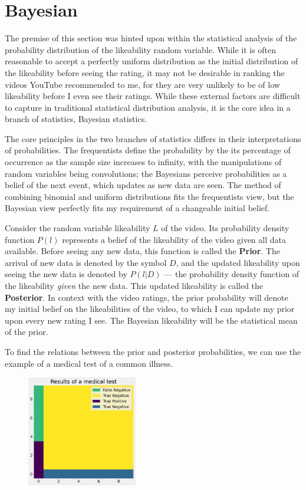 \documentclass[a4paper,11pt]{article}
\begin{document}
\section{Bayesian}

The premise of this section was hinted upon within the statistical analysis of the probability distribution of the likeability random variable. While it is often reasonable to accept a perfectly uniform distribution as the initial distribution of the likeability before seeing the rating, it may not be desirable in ranking the videos YouTube recommended to me, for they are very unlikely to be of low likeability before I even see their ratings. While these external factors are difficult to capture in traditional statistical distribution analysis, it is the core idea in a branch of statistics, Bayesian statistics.

The core principles in the two branches of statistics differs in their interpretations of probabilities. The frequentists define the probability by the its percentage of occurrence as the sample size increases to infinity, with the manipulations of random variables being convolutions; the Bayesians perceive probabilities as a belief of the next event, which updates as new data are seen. The method of combining binomial and uniform distributions fits the frequentists view, but the Bayesian view perfectly fits my requirement of a changeable initial belief.

Consider the random variable likeability $L$ of the video. Its probability density function $P(l)$ represents a belief of the likeability of the video given all data available. Before seeing any new data, this function is called the \textbf{Prior}. The arrival of new data is denoted by the symbol $D$, and the updated likeability upon seeing the new data is denoted by $P(l | D)$ --- the probability density function of the likeability \textit{given} the new data. This updated likeability is called the \textbf{Posterior}. In context with the video ratings, the prior probability will denote my initial belief on the likeabilities of the video, to which I can update my prior upon every new rating I see. The Bayesian likeability will be the statistical mean of the prior.

To find the relations between the prior and posterior probabilities, we can use the example of a medical test of a common illness.

\begin{figure}
    \includegraphics[width=0.43\textwidth,right]{assets/medical_scenario.png}
    \caption{}
    \label{fig:medical}
\end{figure}
\end{document}
